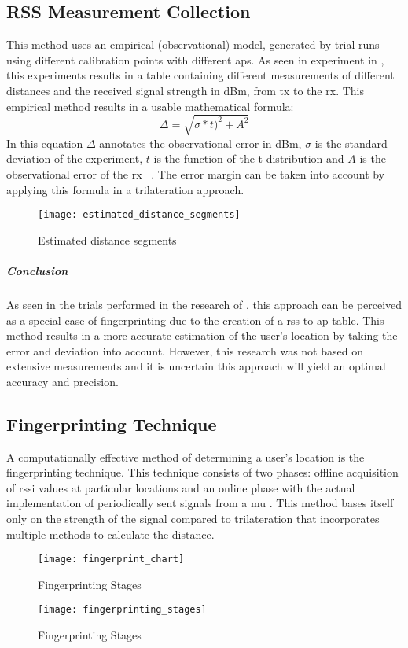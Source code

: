 \subsection{RSS Measurement Collection}
This method uses an empirical (observational) model, generated by trial runs using different calibration points with different \acrlong{ap}s. As seen in experiment in \cite{Shchekotov}, this experiments results in a table containing different measurements of different distances and the received signal strength in dBm, from \acrlong{tx} to the \acrlong{rx}. This empirical method results in a usable mathematical formula:
\[
\Delta = \sqrt{\sigma * t)^2 + A^2}
\]
In this equation $\Delta$ annotates the observational error in dBm, $\sigma$ is the standard deviation of the experiment, $t$ is the function of the t-distribution and $A$ is the observational error of the \acrfull{rx} ~\cite[p.178]{Shchekotov}. The error margin can be taken into account by applying this formula in a trilateration approach.
\begin{figure}[h!]
\centering
\texttt{[image: estimated\_distance\_segments]}
\caption{Estimated distance segments ~\cite[p.179]{Shchekotov}}
\label{fig:estimated_distance_segments}
\end{figure}
\subparagraph{Conclusion}
As seen in the trials performed in the research of \cite{Shchekotov}, this approach can be perceived as a special case of fingerprinting due to the creation of a \acrshort{rss} to \acrshort{ap} table. This method results in a more accurate estimation of the user's location by taking the error and deviation into account. However, this research was not based on extensive measurements and it is uncertain this approach will yield an optimal accuracy and precision.
\subsection{Fingerprinting Technique}
A computationally effective method of determining a user's location is the fingerprinting technique. This technique consists of two phases: offline acquisition of \acrshort{rssi} values at particular locations and an online phase with the actual implementation of periodically sent signals from a \acrshort{mu} \cite[p.~9]{Retscher}. This method bases itself only on the strength of the signal compared to trilateration that incorporates multiple methods to calculate the distance.
\begin{figure}[h!]
\centering
\texttt{[image: fingerprint\_chart]}
\caption{Fingerprinting Stages ~\cite[p.11]{S2016}}
\label{fig:fingerprint_chart}
\end{figure}
\begin{figure}[h!]
\centering
\texttt{[image: fingerprinting\_stages]}
\caption{Fingerprinting Stages ~\cite[p.2]{Li}}
\label{fig:fingerprint_stages}
\end{figure}
